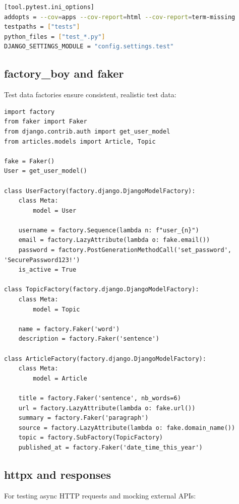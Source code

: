 \documentclass{report}
\begin{document}
\begin{lstlisting}[language=bash, caption=pytest-cov configuration in pyproject.toml]
[tool.pytest.ini_options]
addopts = --cov=apps --cov-report=html --cov-report=term-missing
testpaths = ["tests"]
python_files = ["test_*.py"]
DJANGO_SETTINGS_MODULE = "config.settings.test"
\end{lstlisting}

\subsection{factory\_boy and faker}

Test data factories ensure consistent, realistic test data:

\begin{lstlisting}[caption=Factory definitions using factory\_boy]
import factory
from faker import Faker
from django.contrib.auth import get_user_model
from articles.models import Article, Topic

fake = Faker()
User = get_user_model()

class UserFactory(factory.django.DjangoModelFactory):
    class Meta:
        model = User
    
    username = factory.Sequence(lambda n: f"user_{n}")
    email = factory.LazyAttribute(lambda o: fake.email())
    password = factory.PostGenerationMethodCall('set_password', 'SecurePassword123!')
    is_active = True

class TopicFactory(factory.django.DjangoModelFactory):
    class Meta:
        model = Topic
    
    name = factory.Faker('word')
    description = factory.Faker('sentence')

class ArticleFactory(factory.django.DjangoModelFactory):
    class Meta:
        model = Article
    
    title = factory.Faker('sentence', nb_words=6)
    url = factory.LazyAttribute(lambda o: fake.url())
    summary = factory.Faker('paragraph')
    source = factory.LazyAttribute(lambda o: fake.domain_name())
    topic = factory.SubFactory(TopicFactory)
    published_at = factory.Faker('date_time_this_year')
\end{lstlisting}

\subsection{httpx and responses}

For testing async HTTP requests and mocking external APIs:
\end{document}
